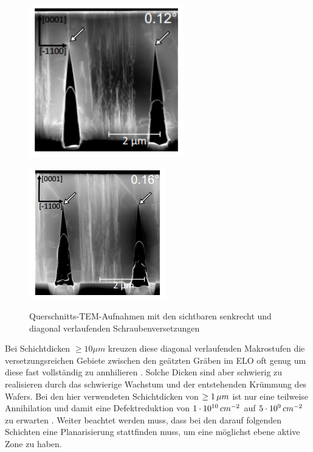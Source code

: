 \begin{figure}[htb]
  \centering
  \begin{minipage}[t]{0.49\textwidth}
    \centering
    \includegraphics[width=0.6\textwidth]{Bilder/offcutsenkrecht.png}
    \label{}
  \end{minipage}
	\hfill
  \begin{minipage}[t]{0.49\textwidth}
    \centering
    \includegraphics[width=0.6\linewidth]{Bilder/offcutdiagonal.png}
    \label{}
  \end{minipage}
	\caption{Querschnitts-TEM-Aufnahmen mit den sichtbaren senkrecht und diagonal verlaufenden Schraubenversetzungen}
	\label{schraubenvers}
\end{figure}
%
Bei Schichtdicken $ \geq 10 \mu m $ kreuzen diese diagonal verlaufenden Makrostufen die versetzungsreichen Gebiete zwischen den geätzten Gräben im ELO oft genug um diese fast vollständig zu annhilieren \cite{fmehnke}. Solche Dicken sind aber schwierig zu realisieren durch das schwierige Wachstum und der entstehenden Krümmung des Wafers. Bei den hier verwendeten Schichtdicken von $ \geq 1 \thinspace \mu m $ ist nur eine teilweise Annihilation und damit eine Defektreduktion von $1\cdot 10^{10} \thinspace cm^{-2}$ auf $5\cdot 10^9 \thinspace cm^{-2}$ zu erwarten \cite{fmehnke}. Weiter beachtet werden muss, dass bei den darauf folgenden Schichten eine Planarisierung stattfinden muss, um eine möglichst ebene aktive Zone zu haben. 
\newpage
